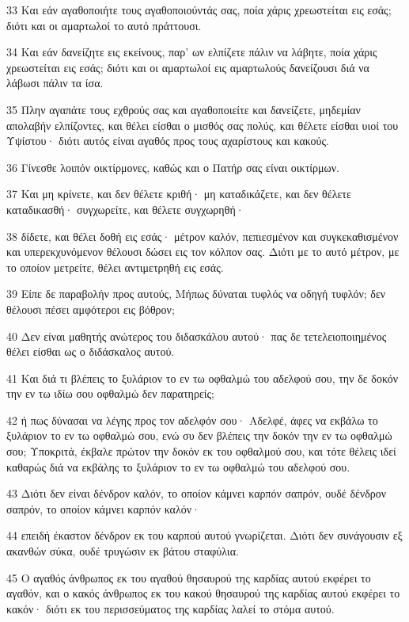 \par 33 Και εάν αγαθοποιήτε τους αγαθοποιούντάς σας, ποία χάρις χρεωστείται εις εσάς; διότι και οι αμαρτωλοί το αυτό πράττουσι.
\par 34 Και εάν δανείζητε εις εκείνους, παρ' ων ελπίζετε πάλιν να λάβητε, ποία χάρις χρεωστείται εις εσάς; διότι και οι αμαρτωλοί εις αμαρτωλούς δανείζουσι διά να λάβωσι πάλιν τα ίσα.
\par 35 Πλην αγαπάτε τους εχθρούς σας και αγαθοποιείτε και δανείζετε, μηδεμίαν απολαβήν ελπίζοντες, και θέλει είσθαι ο μισθός σας πολύς, και θέλετε είσθαι υιοί του Υψίστου· διότι αυτός είναι αγαθός προς τους αχαρίστους και κακούς.
\par 36 Γίνεσθε λοιπόν οικτίρμονες, καθώς και ο Πατήρ σας είναι οικτίρμων.
\par 37 Και μη κρίνετε, και δεν θέλετε κριθή· μη καταδικάζετε, και δεν θέλετε καταδικασθή· συγχωρείτε, και θέλετε συγχωρηθή·
\par 38 δίδετε, και θέλει δοθή εις εσάς· μέτρον καλόν, πεπιεσμένον και συγκεκαθισμένον και υπερεκχυνόμενον θέλουσι δώσει εις τον κόλπον σας. Διότι με το αυτό μέτρον, με το οποίον μετρείτε, θέλει αντιμετρηθή εις εσάς.
\par 39 Είπε δε παραβολήν προς αυτούς, Μήπως δύναται τυφλός να οδηγή τυφλόν; δεν θέλουσι πέσει αμφότεροι εις βόθρον;
\par 40 Δεν είναι μαθητής ανώτερος του διδασκάλου αυτού· πας δε τετελειοποιημένος θέλει είσθαι ως ο διδάσκαλος αυτού.
\par 41 Και διά τι βλέπεις το ξυλάριον το εν τω οφθαλμώ του αδελφού σου, την δε δοκόν την εν τω ιδίω σου οφθαλμώ δεν παρατηρείς;
\par 42 ή πως δύνασαι να λέγης προς τον αδελφόν σου· Αδελφέ, άφες να εκβάλω το ξυλάριον το εν τω οφθαλμώ σου, ενώ συ δεν βλέπεις την δοκόν την εν τω οφθαλμώ σου; Υποκριτά, έκβαλε πρώτον την δοκόν εκ του οφθαλμού σου, και τότε θέλεις ιδεί καθαρώς διά να εκβάλης το ξυλάριον το εν τω οφθαλμώ του αδελφού σου.
\par 43 Διότι δεν είναι δένδρον καλόν, το οποίον κάμνει καρπόν σαπρόν, ουδέ δένδρον σαπρόν, το οποίον κάμνει καρπόν καλόν·
\par 44 επειδή έκαστον δένδρον εκ του καρπού αυτού γνωρίζεται. Διότι δεν συνάγουσιν εξ ακανθών σύκα, ουδέ τρυγώσιν εκ βάτου σταφύλια.
\par 45 Ο αγαθός άνθρωπος εκ του αγαθού θησαυρού της καρδίας αυτού εκφέρει το αγαθόν, και ο κακός άνθρωπος εκ του κακού θησαυρού της καρδίας αυτού εκφέρει το κακόν· διότι εκ του περισσεύματος της καρδίας λαλεί το στόμα αυτού.
